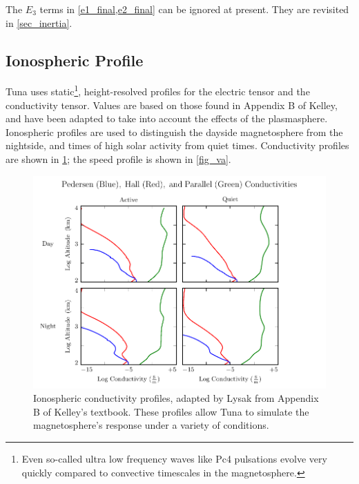 The $E_3$ terms in \cref{e1_final,e2_final} can be ignored at present. They are revisited in \cref{sec_inertia}. 

\subsection{Ionospheric Profile}
  \label{sec_tuna_ionos}


Tuna uses static\footnote{Even so-called ultra low frequency waves like Pc4 pulsations evolve very quickly compared to convective timescales in the magnetosphere. }, height-resolved profiles for the electric tensor and the conductivity tensor. Values are based on those found in Appendix B of Kelley\cite{kelley_1989}, and have been adapted\cite{lysak_2013} to take into account the effects of the plasmasphere. Ionospheric profiles are used to distinguish the dayside magnetosphere from the nightside, and times of high solar activity from quiet times. Conductivity profiles are shown in \cref{fig_sigma}; the \Alfven speed profile is shown in \cref{fig_va}.  

\begin{figure}[!htb]
    \centering
    \includegraphics[width=\textwidth]{figures/sigma.pdf}
    \caption[Ionospheric Conductivity Profiles]{
      Ionospheric conductivity profiles, adapted by Lysak\cite{lysak_2013} from Appendix B of Kelley's textbook\cite{kelley_1989}. These profiles allow Tuna to simulate the magnetosphere's response under a variety of conditions. 
    }
    \label{fig_sigma}
\end{figure}

